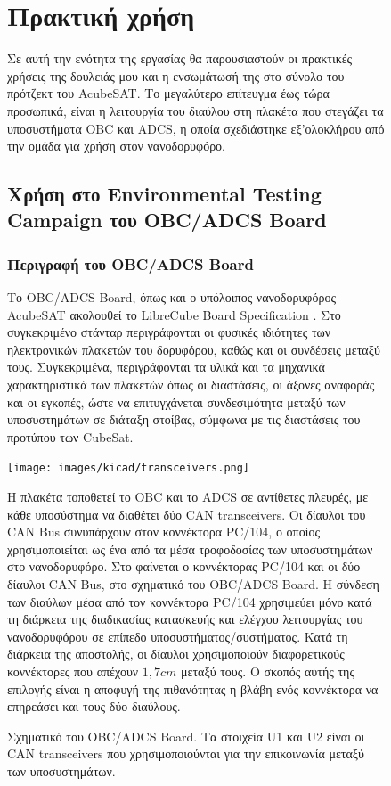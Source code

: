 \documentclass[a4paper,nobib,justified]{tufte-book}
\begin{document}
\begin{figure}
\clearpage

\chapter{Πρακτική χρήση}
\label{chap:usage}
Σε αυτή την ενότητα της εργασίας θα παρουσιαστούν οι πρακτικές χρήσεις της δουλειάς μου και η ενσωμάτωσή της στο σύνολο του πρότζεκτ του AcubeSAT. Το μεγαλύτερο επίτευγμα έως τώρα προσωπικά, είναι η λειτουργία του διαύλου στη πλακέτα που στεγάζει τα υποσυστήματα OBC και ADCS, η οποία σχεδιάστηκε εξ'ολοκλήρου από την ομάδα για χρήση στον νανοδορυφόρο.
\section{Χρήση στο Environmental Testing Campaign του OBC/ADCS Board}
\subsection{Περιγραφή του OBC/ADCS Board}
\label{sec:obc-adcs-board}

Το OBC/ADCS Board, όπως και ο υπόλοιπος νανοδορυφόρος AcubeSAT ακολουθεί το LibreCube Board Specification . Στο συγκεκριμένο στάνταρ περιγράφονται οι φυσικές ιδιότητες των ηλεκτρονικών πλακετών του δορυφόρου, καθώς και οι συνδέσεις μεταξύ τους. Συγκεκριμένα, περιγράφονται τα υλικά και τα μηχανικά χαρακτηριστικά των πλακετών όπως οι διαστάσεις, οι άξονες αναφοράς και οι εγκοπές, ώστε να επιτυγχάνεται συνδεσιμότητα μεταξύ των υποσυστημάτων σε διάταξη στοίβας, σύμφωνα με τις διαστάσεις του προτύπου των CubeSat.

\begin{marginfigure}
	\texttt{[image: images/kicad/transceivers.png]}
	\caption[Σχηματικό του OBC/ADCS Board]{Σχηματικό του OBC/ADCS Board. Τα στοιχεία U1 και U2 είναι οι CAN transceivers που χρησιμοποιούνται για την επικοινωνία μεταξύ των υποσυστημάτων.}
	\label{fig:schematic-transceivers}
\end{marginfigure}

Η πλακέτα τοποθετεί το OBC και το ADCS σε αντίθετες πλευρές, με κάθε υποσύστημα να διαθέτει δύο CAN transceivers. Οι δίαυλοι του CAN Bus συνυπάρχουν στον κοννέκτορα PC/104, ο οποίος χρησιμοποιείται ως ένα από τα μέσα τροφοδοσίας των υποσυστημάτων στο νανοδορυφόρο. Στο  φαίνεται ο κοννέκτορας PC/104 και οι δύο δίαυλοι CAN Bus, στο σχηματικό του OBC/ADCS Board. Η σύνδεση των διαύλων μέσα από τον κοννέκτορα PC/104 χρησιμεύει μόνο κατά τη διάρκεια της διαδικασίας κατασκευής και ελέγχου λειτουργίας του νανοδορυφόρου σε επίπεδο υποσυστήματος/συστήματος. Κατά τη διάρκεια της αποστολής, οι δίαυλοι χρησιμοποιούν διαφορετικούς κοννέκτορες που απέχουν $1,7cm$ μεταξύ τους. Ο σκοπός αυτής της επιλογής είναι η αποφυγή της πιθανότητας η βλάβη ενός κοννέκτορα να επηρεάσει και τους δύο διαύλους. 


\end{figure}
\end{document}
